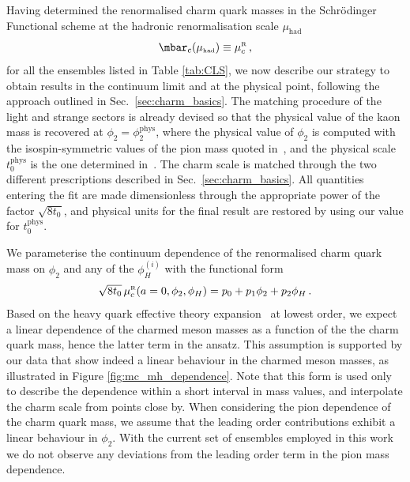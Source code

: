 Having determined the  renormalised charm quark masses in the Schr\"odinger Functional scheme at the hadronic renormalisation scale $\mu_{\mathrm{had}}$
\begin{equation}
\mbar_c(\mu_{\rm\scriptscriptstyle had}) \equiv \mu_c^{\rm\scriptscriptstyle R}\,,
\end{equation}
for all the ensembles listed in Table \ref{tab:CLS}, we now describe our 
strategy to obtain results in the continuum limit and at the physical point,
following the approach outlined in Sec.~\ref{sec:charm_basics}. The matching procedure of the light
and strange sectors is already devised so that the physical value of the kaon mass is recovered
at $\phi_2 = \phi_2^{\mathrm{phys}}$, where the physical value of $\phi_2$ is computed
with the isospin-symmetric values of the pion mass quoted 
in~\cite{FlavourLatticeAveragingGroupFLAG:2021npn}, and the physical scale $t_0^{\mathrm{phys}}$
is the one determined in~\cite{MA1}. The charm scale is matched through the two different
prescriptions described in Sec.~\ref{sec:charm_basics}. All quantities entering the fit
are made dimensionless through the appropriate power of the factor $\sqrt{8t_0}$,
and physical units for the final result are restored by using our value for $t_0^{\mathrm{phys}}$.

We parameterise the continuum dependence of the renormalised charm quark mass on $\phi_2$
and any of the $\phi_H^{(i)}$ with the functional form
\begin{equation}
	\sqrt{8t_0}\, \mu_c^{\rm\scriptscriptstyle R}(a=0, \phi_2, \phi_H) = p_0 + p_1\phi_2 + p_2\phi_H\,.
	\label{eq:mc_continuum_parameterization}
\end{equation}
Based on the heavy quark effective theory expansion~\cite{Georgi:1990um} at lowest order,
we expect a linear dependence of the charmed meson masses as a function of the the charm quark 
mass, hence the latter term in the ansatz. This assumption is supported by our data that show indeed a 
linear behaviour in the charmed meson masses, as illustrated in Figure \ref{fig:mc_mh_dependence}. Note that this form is used only to describe the dependence
within a short interval in mass values, and interpolate the charm scale from points close by. When considering the pion dependence of the charm quark mass, we assume that the  leading order contributions exhibit a linear behaviour in $\phi_2$. With the current set of ensembles employed in this work we do not observe any deviations from the leading order term in the pion mass dependence.

